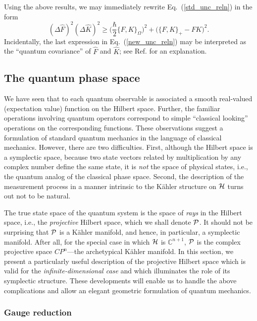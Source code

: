 \documentclass[12pt,aps,eqsecnum,tighten]{revtex4-2}
\def\be{\begin{equation}}
\def\ee{\end{equation}}
\def\D{\Delta}
\def\C{{\mathbb C}}
\def\H{{\cal H}}
\def\P{{\cal P}}
\def\W{\Omega}
\newcommand{\eqn}[1]{Eq.~(\ref{#1})}
\def\Bbb{}
\def\C{\mathbb C}
\begin{document}
Using the above results, we may immediately rewrite \eqn{std_unc_reln}
in the form 
%
\be \label{new_unc_reln}
(\D \hat{F})^2 (\D \hat{K})^2 \ge
\bigg( \frac{\hbar}{2} \{ F, K \}_\W \bigg)^2
+ \big( \{ F, K \}_+ - FK \big)^2.
\ee
%
Incidentally, the last expression in \eqn{new_unc_reln} may be
interpreted as the ``quantum covariance'' of $\hat{F}$ and $\hat{K}$;
see Ref.  for an explanation.


\subsection{The quantum phase space} \label{sec2.B}

We have seen that to each quantum observable is associated a smooth
real-valued (expectation value) function on the Hilbert space.
Further, the familiar operations involving quantum operators
correspond to simple ``classical looking'' operations on the
corresponding functions.  These observations suggest a formulation of
standard quantum mechanics in the language of classical mechanics.
However, there are two difficulties.  First, although the Hilbert
space is a symplectic space, because two state vectors related by
multiplication by any complex number define the same state, it is {\it
not} the space of physical states, i.e., the quantum analog of the
classical phase space.  Second, the description of the measurement
process in a manner intrinsic to the K\"ahler structure on $\H$ turns
out not to be natural.

The true state space of the quantum system is the space of {\em rays}
in the Hilbert space, i.e., the {\em projective} Hilbert space, which
we shall denote $\P$.  It should not be surprising that $\P$ is a
K\"ahler manifold, and hence, in particular, a symplectic manifold.
After all, for the special case in which $\H$ is $\C^{n+1}$, $\P$ is
the complex projective space ${\Bbb CP}^n$---the archetypical K\"ahler
manifold.  In this section, we present a particularly useful
description of the projective Hilbert space which is valid for the
{\it infinite-dimensional case} and which illuminates the role of its
symplectic structure.  These developments will enable us to handle the
above complications and allow an elegant geometric formulation of
quantum mechanics.


\subsubsection{Gauge reduction}
\end{document}
